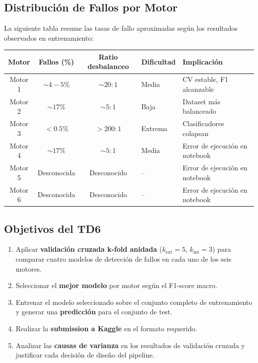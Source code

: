 \documentclass[12pt,a4paper]{article}
\begin{document}
\subsection{Distribuci\'{o}n de Fallos por Motor}

La siguiente tabla resume las tasas de fallo aproximadas seg\'{u}n los resultados
observados en entrenamiento:

\begin{center}
\begin{tabular}{cccll}
\toprule
\textbf{Motor} & \textbf{Fallos (\%)} & \textbf{Ratio desbalanceo} & \textbf{Dificultad} & \textbf{Implicaci\'{o}n} \\
\midrule
Motor 1 & $\sim 4{-}5\%$  & $\sim 20:1$  & Media    & CV estable, F1 alcanzable \\
Motor 2 & $\sim 17\%$     & $\sim 5:1$   & Baja     & Dataset m\'{a}s balanceado \\
Motor 3 & $< 0.5\%$       & $>200:1$     & Extrema  & Clasificadores colapsan \\
Motor 4 & $\sim 17\%$     & $\sim 5:1$   & Media    & Error de ejecuci\'{o}n en notebook \\
Motor 5 & Desconocida     & Desconocido  & --       & Error de ejecuci\'{o}n en notebook \\
Motor 6 & Desconocida     & Desconocido  & --       & Error de ejecuci\'{o}n en notebook \\
\bottomrule
\end{tabular}
\end{center}

\subsection{Objetivos del TD6}

\begin{enumerate}[itemsep=3pt]
  \item Aplicar \textbf{validaci\'{o}n cruzada k-fold anidada} ($k_{\text{ext}}=5$,
    $k_{\text{int}}=3$) para comparar cuatro modelos de detecci\'{o}n de fallos en
    cada uno de los seis motores.
  \item Seleccionar el \textbf{mejor modelo} por motor seg\'{u}n el F1-score macro.
  \item Entrenar el modelo seleccionado sobre el conjunto completo de entrenamiento y
    generar una \textbf{predicci\'{o}n} para el conjunto de test.
  \item Realizar la \textbf{submission a Kaggle} en el formato requerido.
  \item Analizar las \textbf{causas de varianza} en los resultados de validaci\'{o}n cruzada
    y justificar cada decisi\'{o}n de dise\~{n}o del pipeline.
\end{enumerate}
\end{document}
